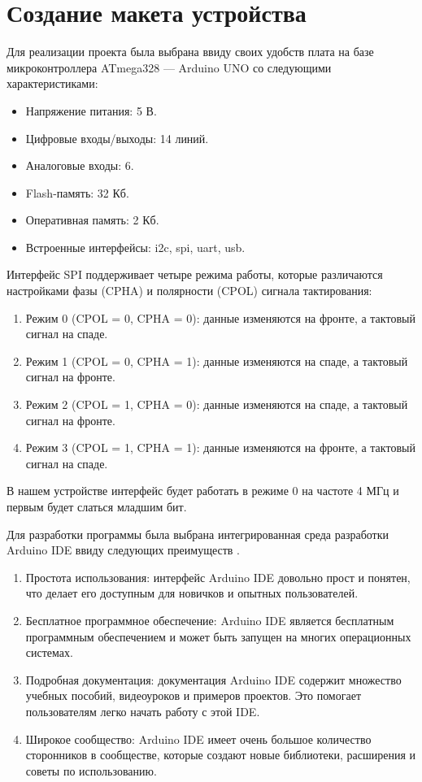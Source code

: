 \documentclass[14pt, oneside]{altsu-report}
\begin{document}
\chapter{Создание макета устройства} 
	Для реализации проекта была выбрана ввиду своих удобств плата на базе микроконтроллера ATmega328 --- Arduino UNO со следующими характеристиками\cite{uno}: 
	\begin{itemize}
		\item Напряжение питания: 5 В.
		\item Цифровые входы/выходы: 14 линий.
		\item Аналоговые входы: 6.
		\item Flash-память: 32 Кб.
		\item Оперативная память: 2 Кб.
		\item Встроенные интерфейсы: i2c, spi, uart, usb.
	\end{itemize}
	
		Интерфейс SPI поддерживает четыре режима работы, которые различаются настройками фазы (CPHA) и полярности (CPOL) сигнала тактирования\cite{spi}:
	\begin{enumerate}
		\item Режим 0 (CPOL = 0, CPHA = 0): данные изменяются на фронте, а тактовый сигнал на спаде.
		\item Режим 1 (CPOL = 0, CPHA = 1): данные изменяются на спаде, а тактовый сигнал на фронте.
		\item Режим 2 (CPOL = 1, CPHA = 0): данные изменяются на спаде, а тактовый сигнал на фронте.
		\item Режим 3 (CPOL = 1, CPHA = 1): данные изменяются на фронте, а тактовый сигнал на спаде.
	\end{enumerate}
		В нашем устройстве интерфейс будет работать в режиме 0 на частоте 4 МГц и первым будет слаться младшим бит. 
	
	Для разработки программы была выбрана интегрированная среда разработки Arduino IDE ввиду следующих преимуществ \cite{ide}.
	\begin{enumerate}
		\item Простота использования: интерфейс Arduino IDE довольно прост и понятен, что делает его доступным для новичков и опытных пользователей.
		\item Бесплатное программное обеспечение: Arduino IDE является бесплатным программным обеспечением и может быть запущен на многих операционных системах.
		\item Подробная документация: документация Arduino IDE содержит множество учебных пособий, видеоуроков и примеров проектов. Это помогает пользователям легко начать работу с этой IDE.
		\item Широкое сообщество: Arduino IDE имеет очень большое количество сторонников в сообществе, которые создают новые библиотеки, расширения и советы по использованию.
	\end{enumerate}
	
\end{document}

